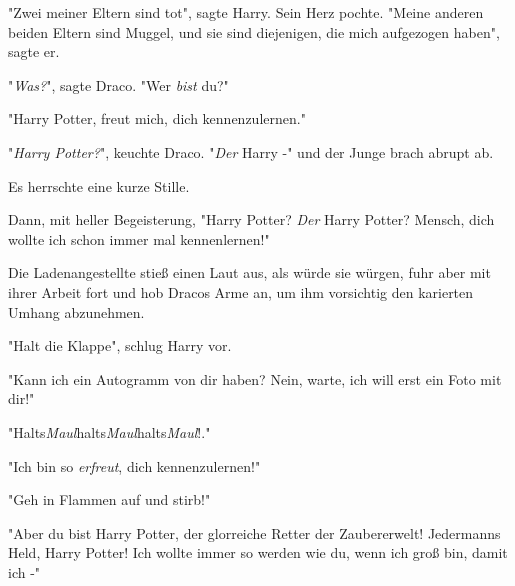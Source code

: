 "Zwei meiner Eltern sind tot", sagte Harry. Sein Herz pochte. "Meine anderen beiden Eltern sind Muggel, und sie sind diejenigen, die mich aufgezogen haben", sagte er. 

"\emph{Was?}", sagte Draco. "Wer \emph{bist} du?"

"Harry Potter, freut mich, dich kennenzulernen." 

"\emph{Harry Potter?}", keuchte Draco. "\emph{Der} Harry -" und der Junge brach abrupt ab. 

Es herrschte eine kurze Stille. 

Dann, mit heller Begeisterung, "Harry Potter? \emph{Der} Harry Potter? Mensch, dich wollte ich schon immer mal kennenlernen!"

Die Ladenangestellte stieß einen Laut aus, als würde sie würgen, fuhr aber mit ihrer Arbeit fort und hob Dracos Arme an, um ihm vorsichtig den karierten Umhang abzunehmen. 

"Halt die Klappe", schlug Harry vor.

"Kann ich ein Autogramm von dir haben? Nein, warte, ich will erst ein Foto mit dir!"

"Halts\emph{Maul}halts\emph{Maul}halts\emph{Maul}!."

"Ich bin so \emph{erfreut}, dich kennenzulernen!"

"Geh in Flammen auf und stirb!" 

"Aber du bist Harry Potter, der glorreiche Retter der Zaubererwelt! Jedermanns Held, Harry Potter! Ich wollte immer so werden wie du, wenn ich groß bin, damit ich -"

